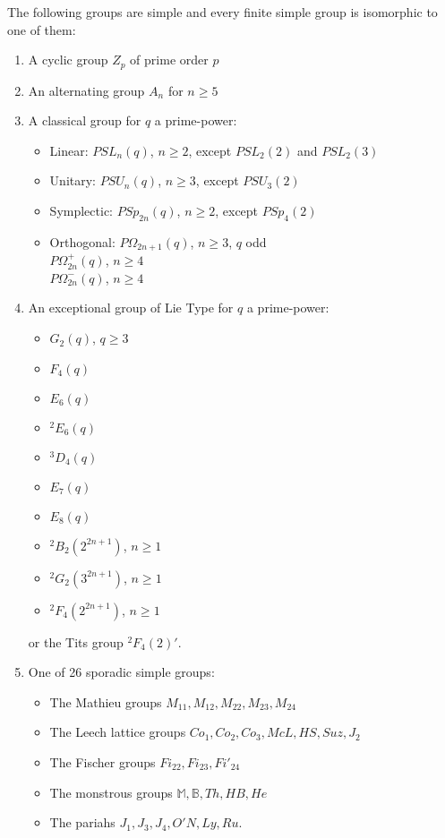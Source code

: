 \documentclass[a4paper]{article}
\begin{document}
\begin{theorem}
The following groups are simple and every finite simple group is isomorphic to one of them:
\begin{enumerate}
	\item
	A cyclic group $Z_p$ of prime order $p$
	\item
	An alternating group $A_n$ for $n \ge 5$
	\item
	A classical group for $q$ a prime-power:
	\begin{itemize}
		\item
		Linear: $PSL_n(q)$, $n \ge 2$, except $PSL_2(2)$ and $PSL_2(3)$
		\item
		Unitary: $PSU_n(q)$, $n \ge 3$, except $PSU_3(2)$
		\item
		Symplectic: $PSp_{2n}(q)$, $n \ge 2$, except $PSp_4(2)$
		\item
		Orthogonal: $P\Omega_{2n+1}(q)$, $n \ge 3$, $q$ odd\\
		$P\Omega^+_{2n}(q)$, $n \ge 4$\\
		$P\Omega^-_{2n}(q)$, $n \ge 4$
	\end{itemize}
	\item
	An exceptional group of Lie Type for $q$ a prime-power:
	\begin{itemize}
		\item $G_2(q)$, $q \ge 3$
		\item $F_4(q)$
		\item $E_6(q)$
		\item ${}^2E_6(q)$
		\item ${}^3D_4(q)$
		\item $E_7(q)$
		\item $E_8(q)$
		\item ${}^2B_2(2^{2n+1})$, $n \ge 1$
		\item ${}^2G_2(3^{2n+1})$, $n \ge 1$
		\item ${}^2F_4(2^{2n+1})$, $n \ge 1$
	\end{itemize}
	or the Tits group ${}^2F_4(2)'$.
	\item
	One of 26 sporadic simple groups:
	\begin{itemize}
		\item
		The Mathieu groups $M_{11}, M_{12}, M_{22}, M_{23}, M_{24}$
		\item
		The Leech lattice groups $Co_1, Co_2, Co_3, McL, HS, Suz, J_2$
		\item
		The Fischer groups $Fi_{22}, Fi_{23}, Fi'_{24}$
		\item
		The monstrous groups $\mathbb{M}, \mathbb{B}, Th, HB, He$
		\item
		The pariahs $J_1, J_3, J_4, O'N, Ly, Ru$.
	\end{itemize}
\end{enumerate}
\end{theorem}
\end{document}
